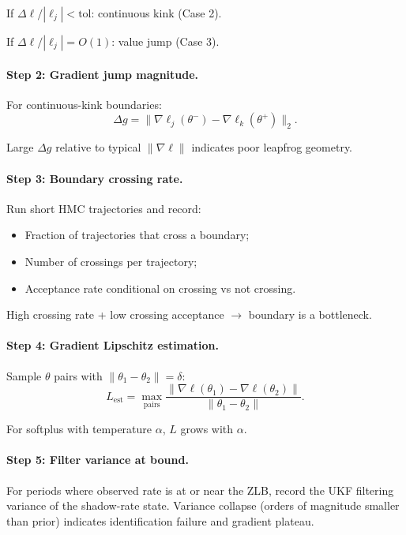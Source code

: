 If $\Delta \ell / |\ell_j| < \text{tol}$: continuous kink (Case 2).

If $\Delta \ell / |\ell_j| = O(1)$: value jump (Case 3).

\paragraph{Step 2: Gradient jump magnitude.}
For continuous-kink boundaries:
\begin{equation}
  \Delta g = \|\nabla \ell_j(\theta^-) - \nabla \ell_k(\theta^+)\|_2.
  \label{eq:gradient-jump-check}
\end{equation}

Large $\Delta g$ relative to typical $\|\nabla \ell\|$ indicates poor
leapfrog geometry.

\paragraph{Step 3: Boundary crossing rate.}
Run short HMC trajectories and record:
\begin{itemize}
  \item Fraction of trajectories that cross a boundary;
  \item Number of crossings per trajectory;
  \item Acceptance rate conditional on crossing vs not crossing.
\end{itemize}

High crossing rate + low crossing acceptance $\to$ boundary is a bottleneck.

\paragraph{Step 4: Gradient Lipschitz estimation.}
Sample $\theta$ pairs with $\|\theta_1 - \theta_2\| = \delta$:
\begin{equation}
  L_{\text{est}} = \max_{\text{pairs}} \frac{\|\nabla \ell(\theta_1) - \nabla \ell(\theta_2)\|}{\|\theta_1 - \theta_2\|}.
  \label{eq:lipschitz-estimate}
\end{equation}

For softplus with temperature $\alpha$, $L$ grows with $\alpha$.

\paragraph{Step 5: Filter variance at bound.}
For periods where observed rate is at or near the ZLB, record the UKF
filtering variance of the shadow-rate state. Variance collapse (orders of
magnitude smaller than prior) indicates identification failure and gradient
plateau.

